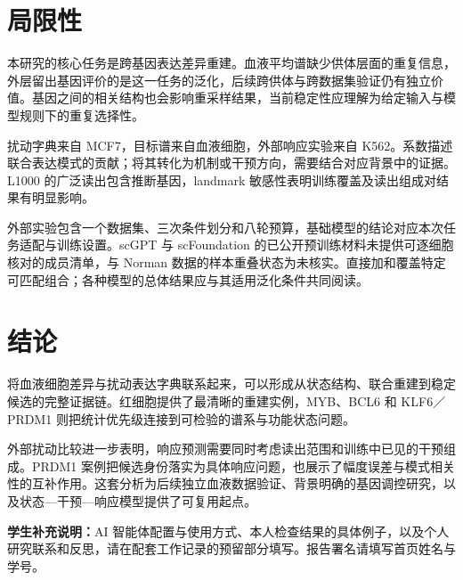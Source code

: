 \documentclass[UTF8,a4paper,11pt,fontset=fandol]{ctexart}
\begin{document}
\clearpage
\section{局限性}
本研究的核心任务是跨基因表达差异重建。血液平均谱缺少供体层面的重复信息，外层留出基因评价的是这一任务的泛化，后续跨供体与跨数据集验证仍有独立价值。基因之间的相关结构也会影响重采样结果，当前稳定性应理解为给定输入与模型规则下的重复选择性。

扰动字典来自 MCF7，目标谱来自血液细胞，外部响应实验来自 K562。系数描述联合表达模式的贡献；将其转化为机制或干预方向，需要结合对应背景中的证据。L1000 的广泛读出包含推断基因，landmark 敏感性表明训练覆盖及读出组成对结果有明显影响。

外部实验包含一个数据集、三次条件划分和八轮预算，基础模型的结论对应本次任务适配与训练设置。scGPT 与 scFoundation 的已公开预训练材料未提供可逐细胞核对的成员清单，与 Norman 数据的样本重叠状态为未核实。直接加和覆盖特定可匹配组合；各种模型的总体结果应与其适用泛化条件共同阅读。
\section{结论}
将血液细胞差异与扰动表达字典联系起来，可以形成从状态结构、联合重建到稳定候选的完整证据链。红细胞提供了最清晰的重建实例，MYB、BCL6 和 KLF6／PRDM1 则把统计优先级连接到可检验的谱系与功能状态问题。

外部扰动比较进一步表明，响应预测需要同时考虑读出范围和训练中已见的干预组成。PRDM1 案例把候选身份落实为具体响应问题，也展示了幅度误差与模式相关性的互补作用。这套分析为后续独立血液数据验证、背景明确的基因调控研究，以及状态—干预—响应模型提供了可复用起点。

\vspace{1em}
\noindent\textbf{学生补充说明：}AI 智能体配置与使用方式、本人检查结果的具体例子，以及个人研究联系和反思，请在配套工作记录的预留部分填写。报告署名请填写首页姓名与学号。

\clearpage
{}
{}

\clearpage
\appendix

\end{document}
